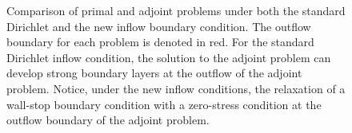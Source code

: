 \documentclass[11pt,onecolumn]{scrartcl}
\begin{document}
\begin{figure}[h!]
\caption{Comparison of primal and adjoint problems under both the standard Dirichlet and the new inflow boundary condition. The outflow boundary for each problem is denoted in red. For the standard Dirichlet inflow condition, the solution to the adjoint problem can develop strong boundary layers at the outflow of the adjoint problem. Notice, under the new inflow conditions, the relaxation of a wall-stop boundary condition with a zero-stress condition at the outflow boundary of the adjoint problem.}
\end{figure}
\end{document}
